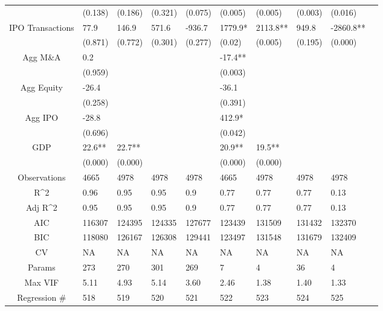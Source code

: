 \documentclass{article}
\begin{document}
\begin{table}[H]
\begin{tabular}{|clllllllll|}
   & (0.138) & (0.186) & (0.321) & (0.075) & (0.005) & (0.005) & (0.003) & (0.016) & \\ 
  IPO Transactions & 77.9 & 146.9 & 571.6 & -936.7 & 1779.9* & 2113.8** & 949.8 & -2860.8** & \\ 
   & (0.871) & (0.772) & (0.301) & (0.277) & (0.02) & (0.005) & (0.195) & (0.000) & \\ 
  Agg M\&A & 0.2 &  &  &  & -17.4** &  &  &  & \\ 
   & (0.959) &  &  &  & (0.003) &  &  &  & \\ 
  Agg Equity & -26.4 &  &  &  & -36.1 &  &  &  & \\ 
   & (0.258) &  &  &  & (0.391) &  &  &  & \\ 
  Agg IPO & -28.8 &  &  &  & 412.9* &  &  &  & \\ 
   & (0.696) &  &  &  & (0.042) &  &  &  & \\ 
  GDP & 22.6** & 22.7** &  &  & 20.9** & 19.5** &  &  & \\ 
   & (0.000) & (0.000) &  &  & (0.000) & (0.000) &  &  & \\ 
  \hline 
 Observations & 4665 & 4978 & 4978 & 4978 & 4665 & 4978 & 4978 & 4978 & \\ 
  R^2 & 0.96 & 0.95 & 0.95 & 0.9 & 0.77 & 0.77 & 0.77 & 0.13 & \\ 
  Adj R^2 & 0.95 & 0.95 & 0.95 & 0.9 & 0.77 & 0.77 & 0.77 & 0.13 & \\ 
  AIC & 116307 & 124395 & 124335 & 127677 & 123439 & 131509 & 131432 & 132370 & \\ 
  BIC & 118080 & 126167 & 126308 & 129441 & 123497 & 131548 & 131679 & 132409 & \\ 
  CV & NA & NA & NA & NA & NA & NA & NA & NA & \\ 
  Params & 273 & 270 & 301 & 269 & 7 & 4 & 36 & 4 & \\ 
  Max VIF & 5.11 & 4.93 & 5.14 & 3.60 & 2.46 & 1.38 & 1.40 & 1.33 & \\ 
  Regression \# & 518 & 519 & 520 & 521 & 522 & 523 & 524 & 525 & \\ 
   \hline
\end{tabular}
 
\end{table}
\end{document}
